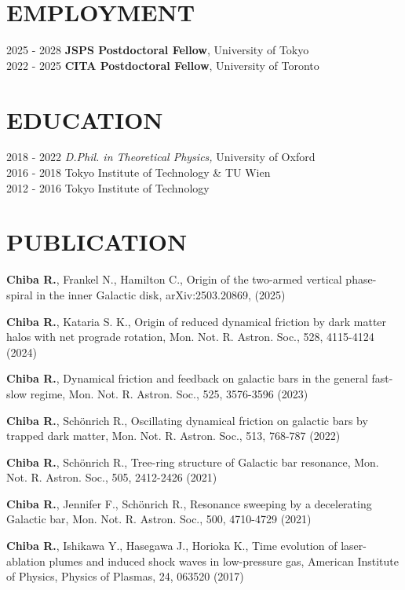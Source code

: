 \documentclass[]{res}
\begin{document}
\begin{resume}

\section{EMPLOYMENT}
\noindent
\begin{tabbing}
    2025 - 2028 \hspace{2mm} \=\textbf{JSPS Postdoctoral Fellow}, University of Tokyo\\
    2022 - 2025 \hspace{2mm} \=\textbf{CITA Postdoctoral Fellow}, University of Toronto
\end{tabbing}

\section{EDUCATION}
\noindent
\begin{tabbing}
    2018 - 2022 \hspace{2mm} \={\sl D.Phil. in Theoretical Physics,} University of Oxford\\
    2016 - 2018 \hspace{2mm}  Tokyo Institute of Technology \& TU Wien\\ 
    2012 - 2016 \hspace{2mm}  Tokyo Institute of Technology
\end{tabbing}

\section{PUBLICATION}
\begin{etaremune}[leftmargin=6mm,rightmargin=-6mm]
    \item \textbf{Chiba R.}, Frankel N., Hamilton C., Origin of the two-armed vertical phase-spiral in the inner Galactic disk, arXiv:2503.20869, (2025)
    \item \textbf{Chiba R.}, Kataria S. K., Origin of reduced dynamical friction by dark matter halos with net prograde rotation, Mon. Not. R. Astron. Soc., 528, 4115-4124 (2024)
    \item \textbf{Chiba R.}, Dynamical friction and feedback on galactic bars in the general fast-slow regime, Mon. Not. R. Astron. Soc., 525, 3576-3596 (2023)
    \item \textbf{Chiba R.}, Schönrich R., Oscillating dynamical friction on galactic bars by trapped dark matter, Mon. Not. R. Astron. Soc., 513, 768-787 (2022)
    \item \textbf{Chiba R.}, Schönrich R., Tree-ring structure of Galactic bar resonance, Mon. Not. R. Astron. Soc., 505, 2412-2426 (2021)
    \item \textbf{Chiba R.}, Jennifer F., Schönrich R., Resonance sweeping by a decelerating Galactic bar, Mon. Not. R. Astron. Soc., 500, 4710-4729 (2021)
    \item \textbf{Chiba R.}, Ishikawa Y., Hasegawa J., Horioka K., Time evolution of laser-ablation plumes and induced shock waves in low-pressure gas, American Institute of Physics, Physics of Plasmas, 24, 063520 (2017)
\end{etaremune}


\end{resume}
\end{document}
